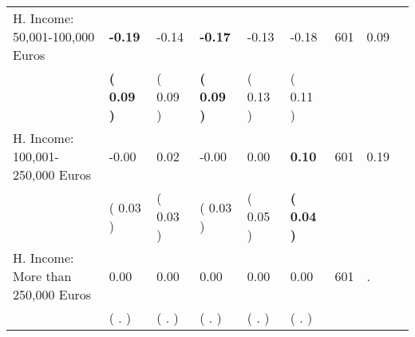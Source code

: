 \begin{tabular}{L{6.2cm} C{1.8cm} C{1.8cm} C{1.8cm} C{1.8cm} C{1.8cm} C{1.8cm} C{0.3cm} C{0.3cm}}
H. Income: 50,001-100,000 Euros & \textbf{    -0.19} &     -0.14 & \textbf{    -0.17} &     -0.13 &     -0.18  & 601 &       0.09 \\ 
 & \textbf{(     0.09 )} & (     0.09 ) & \textbf{(     0.09 )} & (     0.13 ) & (     0.11 )  & \\
H. Income: 100,001-250,000 Euros &     -0.00 &      0.02 &     -0.00 &      0.00 & \textbf{     0.10}  & 601 &       0.19 \\ 
 & (     0.03 ) & (     0.03 ) & (     0.03 ) & (     0.05 ) & \textbf{(     0.04 )}  & \\
H. Income: More than 250,000 Euros &      0.00 &      0.00 &      0.00 &      0.00 &      0.00  & 601 &          . \\ 
 & (        . ) & (        . ) & (        . ) & (        . ) & (        . )  & \\
\bottomrule
\end{tabular}
